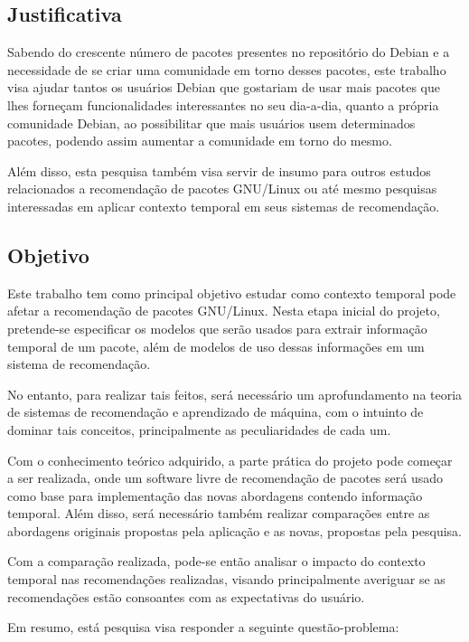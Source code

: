 \subsection{Justificativa}

Sabendo do crescente número de pacotes presentes no repositório do Debian e a
necessidade de se criar uma comunidade em torno desses pacotes, este trabalho
visa ajudar tantos os usuários Debian que gostariam de usar mais pacotes que
lhes forneçam funcionalidades interessantes no seu dia-a-dia, quanto a própria
comunidade Debian, ao possibilitar que mais usuários usem determinados pacotes,
podendo assim aumentar a comunidade em torno do mesmo.

Além disso, esta pesquisa também visa servir de insumo para outros estudos
relacionados a recomendação de pacotes GNU/Linux ou até mesmo pesquisas
interessadas em aplicar contexto temporal em seus sistemas de recomendação.

\subsection{Objetivo}

Este trabalho tem como principal objetivo estudar como contexto temporal pode
afetar a recomendação de pacotes GNU/Linux. Nesta etapa inicial do projeto,
pretende-se especificar os modelos que serão usados para extrair informação
temporal de um pacote, além de modelos de uso dessas informações em um sistema
de recomendação.

No entanto, para realizar tais feitos, será necessário um aprofundamento na
teoria de sistemas de recomendação e aprendizado de máquina, com o intuinto de
dominar tais conceitos, principalmente as peculiaridades de cada um.

Com o conhecimento teórico adquirido, a parte prática do projeto pode começar a
ser realizada, onde um software livre de recomendação de pacotes será usado como
base para implementação das novas abordagens contendo informação temporal. Além
disso, será necessário também realizar comparações entre as abordagens originais
propostas pela aplicação e as novas, propostas pela pesquisa.

Com a comparação realizada, pode-se então analisar o impacto do contexto
temporal nas recomendações realizadas, visando principalmente averiguar se as
recomendações estão consoantes com as expectativas do usuário.

Em resumo, está pesquisa visa responder a seguinte questão-problema:

